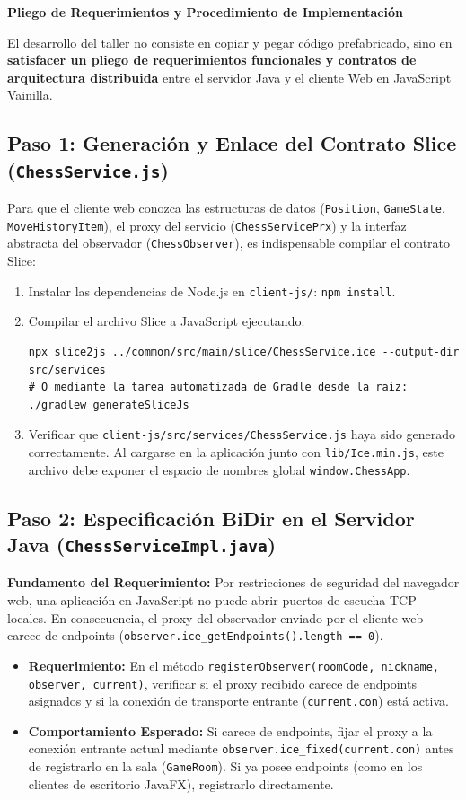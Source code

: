 \documentclass[10pt,letterpaper]{article}
\newcommand{\sectionBadge}[1]{%
  \refstepcounter{section}%
  \vspace{0.24cm}%
  \noindent%
  \colorbox{icesiBlue}{\color{white}\rule[-0.08cm]{0pt}{0.42cm}\hspace{0.16cm}\textbf{\normalsize \thesection}\hspace{0.16cm}}%
  \hspace{0.18cm}%
  {\fontsize{9.5}{12}\selectfont\textbf{\color{icesiDark}#1}}\\[-0.10cm]%
  \noindent{\color{icesiDark}\rule{\textwidth}{0.8pt}}\vspace{0.10cm}%
}
\begin{document}
\sectionBadge{Pliego de Requerimientos y Procedimiento de Implementación}

El desarrollo del taller no consiste en copiar y pegar código prefabricado, sino en \textbf{satisfacer un pliego de requerimientos funcionales y contratos de arquitectura distribuida} entre el servidor Java y el cliente Web en JavaScript Vainilla.

\subsection*{Paso 1: Generación y Enlace del Contrato Slice (\texttt{ChessService.js})}
Para que el cliente web conozca las estructuras de datos (\texttt{Position}, \texttt{GameState}, \texttt{MoveHistoryItem}), el proxy del servicio (\texttt{ChessServicePrx}) y la interfaz abstracta del observador (\texttt{ChessObserver}), es indispensable compilar el contrato Slice:
\begin{enumerate}[leftmargin=*,itemsep=1pt]
    \item Instalar las dependencias de Node.js en \texttt{client-js/}: \lstinline|npm install|.
    \item Compilar el archivo Slice a JavaScript ejecutando:
\begin{lstlisting}[style=bashstyle]
npx slice2js ../common/src/main/slice/ChessService.ice --output-dir src/services
# O mediante la tarea automatizada de Gradle desde la raiz: ./gradlew generateSliceJs
\end{lstlisting}
    \item Verificar que \texttt{client-js/src/services/ChessService.js} haya sido generado correctamente. Al cargarse en la aplicación junto con \texttt{lib/Ice.min.js}, este archivo debe exponer el espacio de nombres global \texttt{window.ChessApp}.
\end{enumerate}

\subsection*{Paso 2: Especificación BiDir en el Servidor Java (\texttt{ChessServiceImpl.java})}
\textbf{Fundamento del Requerimiento:} Por restricciones de seguridad del navegador web, una aplicación en JavaScript no puede abrir puertos de escucha TCP locales. En consecuencia, el proxy del observador enviado por el cliente web carece de endpoints (\lstinline|observer.ice_getEndpoints().length == 0|).
\begin{itemize}[leftmargin=*,itemsep=2pt]
    \item \textbf{Requerimiento:} En el método \texttt{registerObserver(roomCode, nickname, observer, current)}, verificar si el proxy recibido carece de endpoints asignados y si la conexión de transporte entrante (\texttt{current.con}) está activa.
    \item \textbf{Comportamiento Esperado:} Si carece de endpoints, fijar el proxy a la conexión entrante actual mediante \lstinline|observer.ice_fixed(current.con)| antes de registrarlo en la sala (\texttt{GameRoom}). Si ya posee endpoints (como en los clientes de escritorio JavaFX), registrarlo directamente.
\end{itemize}
\end{document}
